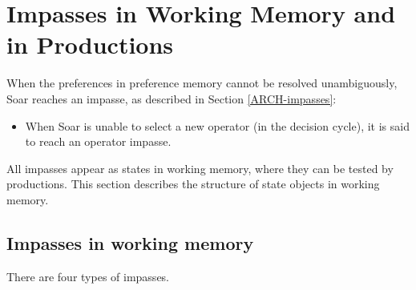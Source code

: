 


\section{Impasses in Working Memory and in Productions}
\label{SYNTAX-impasses}

When the preferences in preference memory cannot be resolved unambiguously,
Soar reaches an impasse, as described in Section \ref{ARCH-impasses}:\vspace{-
12pt}
\begin{itemize}
\item When Soar is unable to select a new operator (in the decision cycle), it
        is said to reach an operator impasse.\vspace{-8pt}
\end{itemize}

All impasses appear as states in working memory, where they can be
tested by productions.  This section describes the structure of state
objects in working memory.

\subsection{Impasses in working memory}
\label{SYNTAX-impasseaug}       %

There are four types of impasses. 


